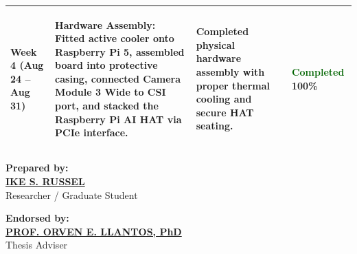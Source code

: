 \documentclass[10pt,a4paper]{article}
\begin{document}
\begin{tabularx}{\textwidth}{@{} p{2.2cm} >{\raggedright\arraybackslash}X >{\raggedright\arraybackslash}X p{2.0cm} @{}}
\midrule

\textbf{Week 4}\newline
\footnotesize{(Aug 24 -- Aug 31)} & 
\begin{tableitems}
    \item \textbf{Hardware Assembly:} Fitted active cooler onto Raspberry Pi 5, assembled board into protective casing, connected Camera Module 3 Wide to CSI port, and stacked the Raspberry Pi AI HAT via PCIe interface.
\end{tableitems} & 
\begin{tableitems}
    \item Completed physical hardware assembly with proper thermal cooling and secure HAT seating.
\end{tableitems} & 
\textcolor{darkgreen}{\textbf{Completed}}\newline
\footnotesize{100\%} \\

\bottomrule
\end{tabularx}

\vspace{1.2cm}

\noindent
\begin{minipage}[t]{0.45\textwidth}
    \textbf{Prepared by:}\\[1.6cm]
    \textbf{\underline{IKE S. RUSSEL}}\\[2pt]
    Researcher / Graduate Student
\end{minipage}
\hfill
\begin{minipage}[t]{0.45\textwidth}
    \textbf{Endorsed by:}\\[1.6cm]
    \textbf{\underline{PROF. ORVEN E. LLANTOS, PhD}}\\[2pt]
    Thesis Adviser
\end{minipage}
\end{document}
